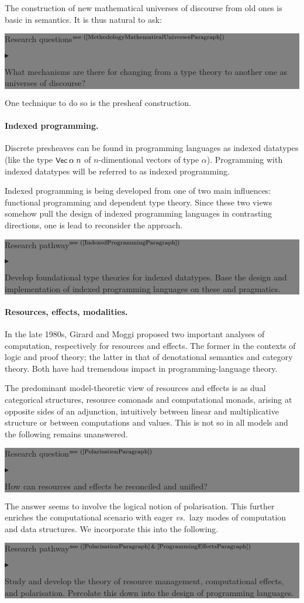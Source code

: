 \documentclass[11pt,twocolumn]{article}
\newenvironment{btritemize}
  {\begin{list}{\btr}
  {\setlength{\topsep}{2pt}
   \setlength{\partopsep}{2pt}
   \setlength{\itemsep}{2.5pt}
   \setlength{\parsep}{2.5pt}
   \setlength{\leftmargin}{1em}
   \setlength{\labelwidth}{.5em}}}
  {\end{list}}
\newcommand{\mytextsf}[1]{\textsf{\small #1}}
\newcommand{\vs}{\emph{vs.}}
\newcommand{\btr}{$\blacktriangleright$}
\newcommand{\reqpsize}{8.113395cm}%
\newcommand{\req}[2]{\begin{center}\colorbox{grey}{\begin{minipage}{\reqpsize} 
  \mytextsf{Research question}\hfill$^{\mbox{\scriptsize see (#1) }}$\\[-5.5mm]
  \begin{btritemize}
  \item #2
  \end{btritemize}
\end{minipage}}\end{center}}
\newcommand{\reqs}[2]{\begin{center}\colorbox{grey}{\begin{minipage}{\reqpsize}
  \mytextsf{Research questions}\hfill$^{\mbox{\scriptsize see (#1) }}$\\[-5.5mm]
  \begin{btritemize}
  \item #2
  \end{btritemize}
\end{minipage}}\end{center}}
\newcommand{\rep}[2]{\begin{center}\colorbox{grey}{\begin{minipage}{\reqpsize}
  \mytextsf{Research pathway}\hfill$^{\mbox{\scriptsize see (#1) }}$\\[-5.5mm]
  \begin{btritemize}
  \item #2
  \end{btritemize}
\end{minipage}}\end{center}}
\begin{document}
The construction of new mathematical universes of discourse from old ones is
basic in semantics.  It is thus natural to ask:
\reqs{\ref{MethodologyMathematicalUniversesParagraph}}
  {What mechanisms are there for changing from a type theory to another one
    as universes of discourse? 
%
}
%
One technique to do so is the presheaf construction.  

\paragraph*{Indexed programming.}

Discrete %
pre\-sheaves can be found in programming languages as indexed data\-types
(like the type $\mbox{\small$\mathsf{Vec}$}\:\alpha\:n$ of
\mbox{$n$-dimentional} vectors of type $\alpha$).  Programming with indexed
datatypes will be referred to as indexed programming.  

Indexed programming is being developed from one of two main influences:
functional programming and dependent type theory.  
Since %
these two views somehow pull the design of indexed programming languages in
contrasting directions, one is lead to reconsider the approach.
\rep{\ref{IndexedProgrammingParagraph}} 
  {Develop foundational type theories for indexed datatypes.  
   Base the design and implementation of indexed programming languages on
   these and pragmatics.}

\paragraph*{Resources, effects, modalities.}

In the late 1980s, 
Girard %
and Moggi %
proposed two important analyses of computation, respectively for resources and
effects.  The former in the contexts of logic and proof theory; the latter in
that of denotational semantics and category theory.  Both have had tremendous
impact in programming-language theory.  

The predominant model-theoretic view of resources and effects is as dual
categorical structures, resource comonads and computational monads, arising at
opposite sides of an adjunction, intuitively between linear and multiplicative
structure or between computations and values.  This is not so in all models
and the following remains unanswered.
%
\req{\ref{PolarisationParagraph}}
  {How can resources and effects be reconciled and unified?}
%
The answer seems to involve the logical notion of
polarisation. %
This further enriches the computational scenario with eager \vs~lazy modes of
computation and data structures.  We incorporate this into the following.
%
\rep{\ref{PolarisationParagraph}\,\&\,\ref{ProgrammingEffectsParagraph}}
  {Study and develop the theory of resource management, computational
    effects, and polarisation.  Percolate this down into the design of
    programming languages.}
\end{document}
